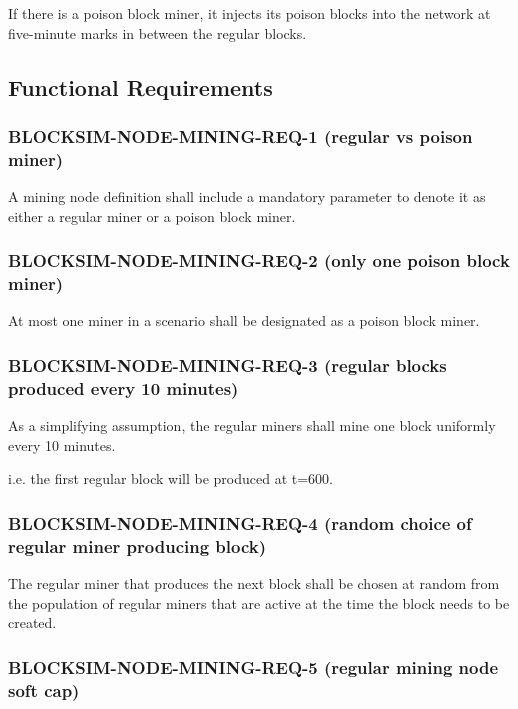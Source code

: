 \documentclass{scrreprt}
\begin{document}
      If there is a poison block miner, it injects its poison blocks into the
      network at five-minute marks in between the regular blocks.

    \subsection{Functional Requirements}

      \subsubsection{BLOCKSIM-NODE-MINING-REQ-1 (regular vs poison miner)}

        A mining node definition shall include a mandatory parameter to denote
        it as either a regular miner or a poison block miner.

      \subsubsection{BLOCKSIM-NODE-MINING-REQ-2 (only one poison block miner)}

        At most one miner in a scenario shall be designated as a poison block
        miner.

      \subsubsection{BLOCKSIM-NODE-MINING-REQ-3 (regular blocks produced every 10 minutes)}

        As a simplifying assumption, the regular miners shall mine one block
        uniformly every 10 minutes.

        i.e. the first regular block will be produced at t=600.

      \subsubsection{BLOCKSIM-NODE-MINING-REQ-4 (random choice of regular miner producing block)}

        The regular miner that produces the next block shall be chosen at
        random from the population of regular miners that are active at the
        time the block needs to be created.

      \subsubsection{BLOCKSIM-NODE-MINING-REQ-5 (regular mining node soft cap)}
\end{document}
